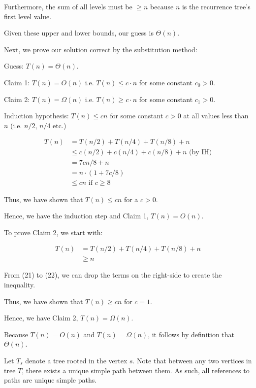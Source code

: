 \documentclass[a4paper]{report}
\begin{document}
\begin{enumerate}
      Furthermore, the sum of all levels must be $\geq n$ because $n$ is the recurrence tree's first level value. 

      Given these upper and lower bounds, our guess is $\Theta(n)$.

      Next, we prove our solution correct by the substitution method:

      Guess: $T(n) = \Theta(n)$.

      Claim 1: $T(n) = O(n)$ i.e. $T(n) \leq c \cdot n$ for some constant $c_{0}>0$.

      Claim 2: $T(n) = \Omega(n)$ i.e. $T(n) \geq c \cdot n$ for some constant $c_{1}>0$.

      Induction hypothesis: $T(n) \leq cn$ for some constant $c>0$ at all values less than $n$ (i.e. $n/2$, $n/4$ etc.)

      \begin{align}
        T(n) &= T(n/2) + T(n/4) + T(n/8) + n \\
        &\leq c(n/2)+ c(n/4) + c(n/8) + n\text{         (by IH)}\\
        &= 7cn / 8 + n \\
        &= n \cdot (1 + 7c/8) \\
        &\leq cn \text{    if $c\geq8$}
      \end{align}

      Thus, we have shown that $T(n) \leq cn$ for a $c>0$.

      Hence, we have the induction step and Claim 1, $T(n) = O(n)$. 

      To prove Claim 2, we start with:

      \begin{align}
        T(n) &= T(n/2) + T(n/4) + T(n/8) + n \\
        &\geq n
      \end{align}

      From (21) to (22), we can drop the terms on the right-side to create the inequality. 

      Thus, we have shown that $T(n) \geq cn$ for $c=1$.

      Hence, we have Claim 2, $T(n) = \Omega(n)$.

      Because $T(n) = O(n)$ and $T(n) = \Omega(n)$, it follows by definition that $\Theta(n)$.



  \end{enumerate}
      Let $T_{s}$ denote a tree rooted in the vertex $s$. Note that between any two vertices in tree $T$, there exists
      a unique simple path between them. As such, all references to paths are unique simple paths.
\end{document}
